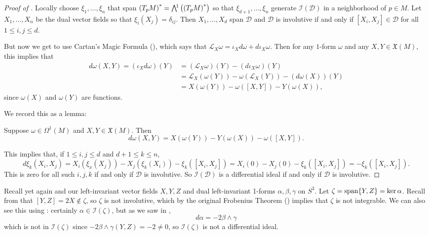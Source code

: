 \begin{proof}[Proof of ]
	Locally choose $\xi_1, \dots , \xi_n$ that span $\left(T_pM\right)^\ast = \ext{1}\left(\left(T_pM\right)^\ast\right)$ so that $\xi_{d+1}, \dots , \xi_n$ generate $\mathcal{I}(\mathcal{D})$ in a neighborhood of $p \in M$. Let $X_1, \dots , X_n$ be the dual vector fields so that $\xi_i(X_j) = \delta_{ij}$. Then $X_1, \dots , X_d$ span $\mathcal{D}$ and $\mathcal{D}$ is involutive if and only if $[X_i, X_j] \in \mathcal{D}$ for all $1 \leq i, j \leq d$.
	
	But now we get to use Cartan's Magic Formula (), which says that $\mathcal{L}_X \omega = \iota_X d\omega + d \iota_X \omega$. Then for any $1$-form $\omega$ and any $X,Y \in \mathfrak{X}(M)$, this implies that
	\begin{align*}
		d \omega(X,Y) = (\iota_X d\omega)(Y) & = (\mathcal{L}_X \omega)(Y)-(d \iota_X \omega)(Y) \\
		& = \mathcal{L}_X(\omega(Y))-\omega(\mathcal{L}_X(Y))-(d\omega(X))(Y) \\
		& = X(\omega(Y))-\omega([X,Y]) - Y(\omega(X)),
	\end{align*}
	since $\omega(X)$ and $\omega(Y)$ are functions.
	
	We record this as a lemma:
	
	\begin{lemma}\label{lem:d 1-form Cartan}
		Suppose $\omega \in \Omega^1(M)$ and $X,Y \in \mathfrak{X}(M)$. Then
		\[
			d \omega(X,Y) = X(\omega(Y))- Y(\omega(X))-\omega([X,Y]).
		\]
	\end{lemma}
	
	This implies that, if $1 \leq i, j \leq d$ and $d+1 \leq k \leq n$,
	\[
		d\xi_k(X_i,X_j) = X_i(\xi_x(X_j)) - X_j(\xi_k(X_i)) - \xi_k([X_i,X_j]) = X_i(0) - X_j(0) - \xi_k([X_i,X_j]) = - \xi_k([X_i,X_j]).
	\]
	This is zero for all such $i,j,k$ if and only if $\mathcal{D}$ is involutive. So $\mathcal{I}(\mathcal{D})$ is a differential ideal if and only if $\mathcal{D}$ is involutive.
\end{proof}

\begin{example}
	Recall yet again  and our left-invariant vector fields $X,Y,Z$ and dual left-invariant 1-forms $\alpha, \beta, \gamma$ on $S^3$. Let $\zeta = \operatorname{span}\{Y,Z\} = \ker \alpha$. Recall from  that $[Y,Z] = 2X \notin \zeta$, so $\zeta$ is not involutive, which by the original Frobenius Theorem () implies that $\zeta$ is not integrable. We can also see this using : certainly $\alpha \in \mathcal{I}(\zeta)$, but as we saw in ,
	\[
		d\alpha = -2 \beta \wedge \gamma
	\]
	which is not in $\mathcal{I}(\zeta)$ since $-2\beta \wedge \gamma(Y,Z) = -2 \neq 0$, so $\mathcal{I}(\zeta)$ is not a differential ideal.
\end{example}

